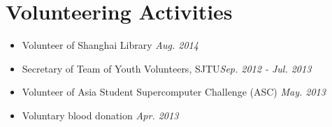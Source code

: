 \documentclass[letterpaper,12pt]{resume}
\begin{document}
\section{Volunteering Activities}
\begin{itemize}
  
   \item {Volunteer of Shanghai Library} {\hfill \textit{Aug. 2014}}
   
    \item {Secretary of Team of Youth Volunteers, SJTU}{\hfill \textit{Sep. 2012 - Jul. 2013}} 
    
     \item {Volunteer of Asia Student Supercomputer Challenge (ASC)} {\hfill \textit{May. 2013}}
     
       \item {Voluntary blood donation} {\hfill \textit{Apr. 2013}}
   
  
\end{itemize} 
\end{document}
